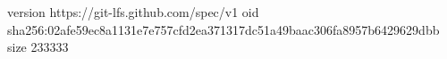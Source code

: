 version https://git-lfs.github.com/spec/v1
oid sha256:02afe59ec8a1131e7e757cfd2ea371317dc51a49baac306fa8957b6429629dbb
size 233333
